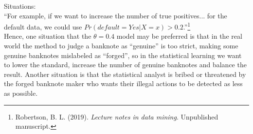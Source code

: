 \documentclass[10pt]{article}
\begin{document}
\begin{enumerate}[1)]
Situations:\\
``For example, if we want to increase the number of true positives... for the default data, we could use $Pr(default=Yes|X=x)>0.2$.''\footnote{ Robertson, B. L. (2019). \textit{Lecture notes in data mining}. Unpublished manuscript.}\\
Hence, one situation that the $\theta=0.4$ model may be preferred is that in the real world the method to judge a banknote as ``genuine'' is too strict, making some genuine banknotes mislabeled as ``forged'', so in the statistical learning we want to lower the standard, increase the number of genuine banknotes and balance the result. Another situation is that the statistical analyst is bribed or threatened by the forged banknote maker who wants their illegal actions to be detected as less as possible. %
\end{enumerate}
\vspace{3mm}
\end{document}
